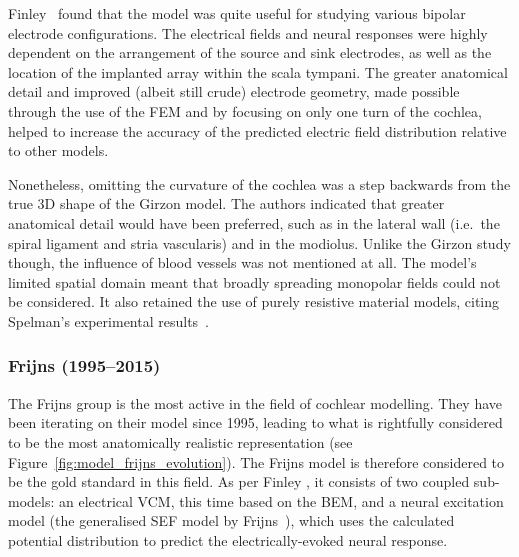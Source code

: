 Finley \etal~found that the model was quite useful for studying various bipolar
electrode configurations. The electrical fields and neural responses were highly
dependent on the arrangement of the source and sink electrodes, as well as the
location of the implanted array within the scala tympani. The greater anatomical
detail and improved (albeit still crude) electrode geometry, made possible
through the use of the FEM and by focusing on only one turn of the cochlea,
helped to increase the accuracy of the predicted electric field distribution
relative to other models.

Nonetheless, omitting the curvature of the cochlea was a step backwards from the
true 3D shape of the Girzon model. The authors indicated that greater anatomical
detail would have been preferred, such as in the lateral wall (i.e.~the spiral
ligament and stria vascularis) and in the modiolus. Unlike the Girzon study
though, the influence of blood vessels was not mentioned at all. The model's
limited spatial domain meant that broadly spreading monopolar fields could not
be considered. It also retained the use of purely resistive material models,
citing Spelman's experimental results~\cite{spelman1982}.

\subsubsection{Frijns \etal{} (1995--2015)}

The Frijns group is the most active in the field of cochlear modelling. They
have been iterating on their model since 1995, leading to what is rightfully
considered to be the most anatomically realistic representation (see
Figure~\ref{fig:model_frijns_evolution}). The Frijns model is therefore
considered to be the gold standard in this field. As per Finley \etal, it
consists of two coupled sub-models: an electrical VCM, this time based on the
BEM, and a neural excitation model (the generalised SEF model by
Frijns~\cite{frijns1995}), which uses the calculated potential
distribution to predict the electrically-evoked neural response.

